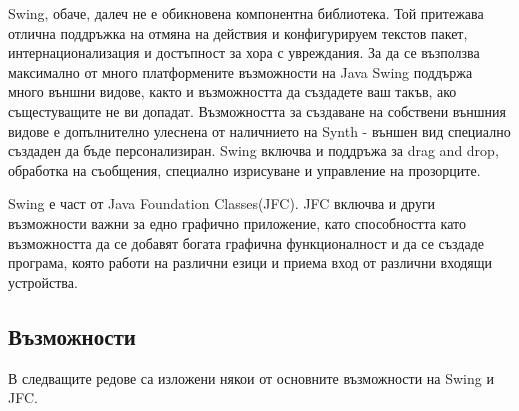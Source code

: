 Swing, обаче, далеч не е обикновена компонентна библиотека. Той
притежава отлична поддръжка на отмяна на действия и конфигурируем
текстов пакет, интернационализация и достъпност за хора с
увреждания. За да се възползва максимално от много платформените
възможности на Java Swing поддържа много външни видове, както и
възможността да създадете ваш такъв, ако същестуващите не ви допадат.
Възможността за създаване на собствени външния видове е допълнително
улеснена от наличнието на Synth - външен вид специално създаден да
бъде персонализиран. Swing включва и поддръжа за drag and drop,
обработка на съобщения, специално изрисуване и управление на
прозорците.

Swing е част от Java Foundation Classes(JFC). JFC включва и други
възможности важни за едно графично приложение, като способността като
възможността да се добавят богата графична функционалност и да се
създаде програма, която работи на различни езици и приема вход от
различни входящи устройства.
\subsection{Възможности}
В следващите редове са изложени някои от основните възможности на
Swing и JFC.

